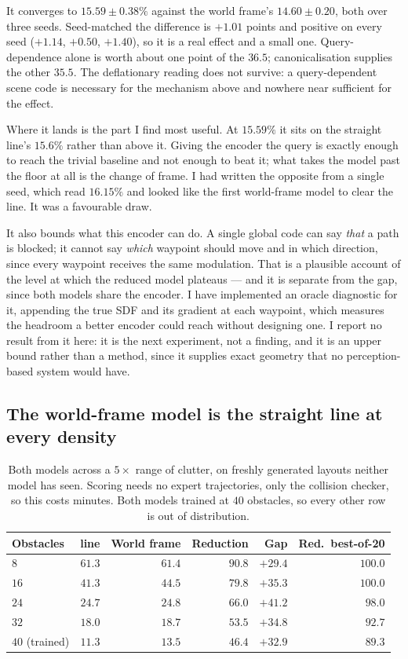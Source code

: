 \documentclass[11pt,a4paper]{article}
\newcommand{\toprule}{\hline}
\newcommand{\midrule}{\hline}
\newcommand{\bottomrule}{\hline}
\begin{document}
It converges to $15.59 \pm 0.38\%$ against the world frame's $14.60 \pm 0.20$,
both over three seeds. Seed-matched the difference is $+1.01$ points and positive
on every seed ($+1.14$, $+0.50$, $+1.40$), so it is a real effect and a small
one. Query-dependence alone is worth about one point of the $36.5$;
canonicalisation supplies the other $35.5$. The deflationary reading does not
survive: a query-dependent scene code is necessary for the mechanism above and
nowhere near sufficient for the effect.

Where it lands is the part I find most useful. At $15.59\%$ it sits on the
straight line's $15.6\%$ rather than above it. Giving the encoder the query is
exactly enough to reach the trivial baseline and not enough to beat it; what
takes the model past the floor at all is the change of frame. I had written the
opposite from a single seed, which read $16.15\%$ and looked like the first
world-frame model to clear the line. It was a favourable draw.

It also bounds what this encoder can do. A single global code can say \emph{that}
a path is blocked; it cannot say \emph{which} waypoint should move and in which
direction, since every waypoint receives the same modulation. That is a plausible
account of the level at which the reduced model plateaus --- and it is separate
from the gap, since both models share the encoder. I have implemented an oracle
diagnostic for it, appending the true SDF and its gradient at each waypoint,
which measures the headroom a better encoder could reach without designing one.
I report no result from it here: it is the next experiment, not a finding, and
it is an upper bound rather than a method, since it supplies exact geometry that
no perception-based system would have.

\subsection{The world-frame model is the straight line at every density}
\label{sec:density}

\begin{table}[t]
\centering
\begin{tabular}{lrrrrr}
\toprule
Obstacles & line & World frame & Reduction & Gap & Red.\ best-of-20 \\
\midrule
$8$            & $61.3$ & $61.4$ & $90.8$ & $+29.4$ & $100.0$ \\
$16$           & $41.3$ & $44.5$ & $79.8$ & $+35.3$ & $100.0$ \\
$24$           & $24.7$ & $24.8$ & $66.0$ & $\mathbf{+41.2}$ & $98.0$ \\
$32$           & $18.0$ & $18.7$ & $53.5$ & $+34.8$ & $92.7$ \\
$40$ (trained) & $11.3$ & $13.5$ & $46.4$ & $+32.9$ & $89.3$ \\
\bottomrule
\end{tabular}
\caption{Both models across a $5\times$ range of clutter, on freshly generated
layouts neither model has seen. Scoring needs no expert trajectories, only the
collision checker, so this costs minutes. Both models trained at $40$ obstacles, so
every other row is out of distribution.}
\label{tab:density}
\end{table}
\end{document}
